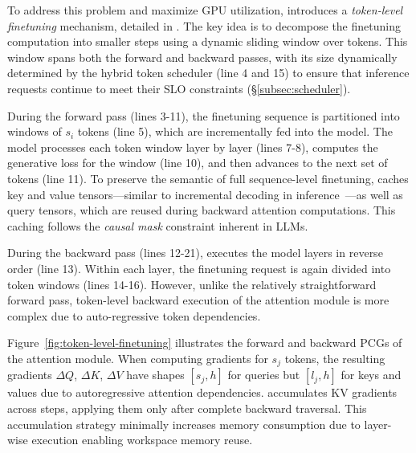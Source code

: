To address this problem and maximize GPU utilization, \sys introduces a \textit{token-level finetuning} mechanism, detailed in . The key idea is to decompose the finetuning computation into smaller steps using a dynamic sliding window over tokens. This window spans both the forward and backward passes, with its size dynamically determined by the hybrid token scheduler (line 4 and 15) to ensure that inference requests continue to meet their SLO constraints (\S\ref{subsec:scheduler}). 

During the forward pass (lines 3-11), the finetuning sequence is partitioned into windows of $s_i$ tokens (line 5), which are incrementally fed into the model. The model processes each token window layer by layer (lines 7-8), computes the generative loss for the window (line 10), and then advances to the next set of tokens (line 11).
To preserve the semantic of full sequence-level finetuning, \sys caches key and value tensors---similar to incremental decoding in inference~\cite{yu2022orca}---as well as query tensors, which are reused during backward attention computations. This caching follows the {\em causal mask} constraint inherent in LLMs.

During the backward pass (lines 12-21), \sys executes the model layers in reverse order (line 13).
Within each layer, the finetuning request is again divided into token windows (lines 14-16). 
However, unlike the relatively straightforward forward pass, token-level backward execution of the attention module is more complex due to auto-regressive token dependencies.

Figure~\ref{fig:token-level-finetuning} illustrates the forward and backward PCGs of the attention module. When computing gradients for $s_j$ tokens, the resulting gradients $\Delta Q$, $\Delta K$, $\Delta V$ have shapes $[s_j, h]$ for queries but $[l_j, h]$ for keys and values due to autoregressive attention dependencies. \sys accumulates KV gradients across steps, applying them only after complete backward traversal. This accumulation strategy minimally increases memory consumption due to layer-wise execution enabling workspace memory reuse.

